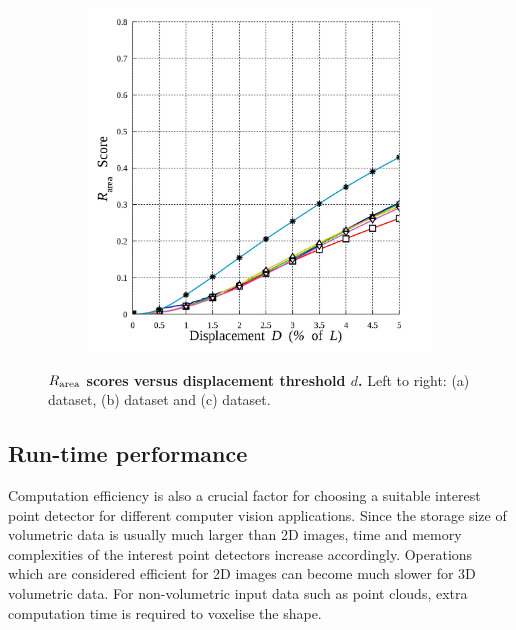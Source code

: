 \begin{figure}[ht]
\begin{subfigure}[t]{0.49\linewidth}
		\label{fig/eval/graph_mri}
	\end{subfigure}
	\begin{subfigure}[t]{0.49\linewidth}
		\centering 
		\includegraphics[width=0.95\linewidth]{./fig/eval/graph_stereo.jpg}
		\label{fig/eval/graph_mvs}
	\end{subfigure}
	\caption{\textbf{$R_\textrm{area}$ scores versus displacement threshold $d$.} Left to right: (a) \meshset dataset, (b) \mriset dataset and (c) \stereoset dataset.}
\label{fig/eval/graph2}
\end{figure}

\subsection{Run-time performance}

Computation efficiency is also a crucial factor for choosing a suitable interest point detector for different computer vision applications. Since the storage size of volumetric data is usually much larger than 2D images, time and memory complexities of the interest point detectors increase accordingly. Operations which are considered efficient for 2D images can become much slower for 3D volumetric data. For non-volumetric input data such as point clouds, extra computation time is required to voxelise the shape. 

